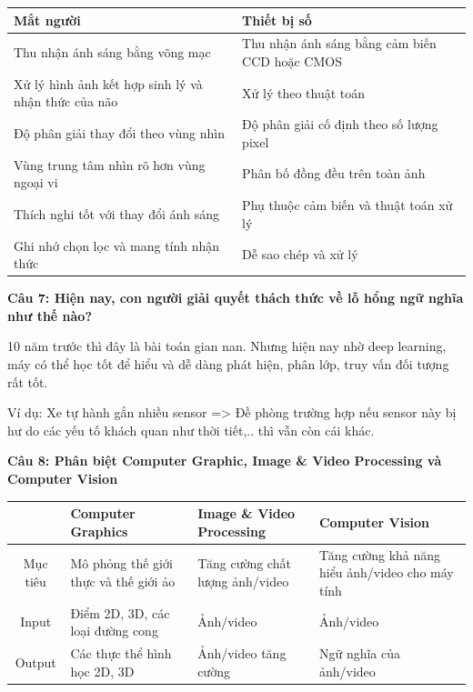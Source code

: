 \begin{table}[H]
	\centering
	\begin{tabular}{|p{7cm}|p{7cm}|}
		\hline
		Mắt người & Thiết bị số \\ \hline
		Thu nhận ánh sáng bằng võng mạc & Thu nhận ánh sáng bằng cảm biến CCD hoặc CMOS \\ \hline
		Xử lý hình ảnh kết hợp sinh lý và nhận thức của não & Xử lý theo thuật toán \\ \hline
		Độ phân giải thay đổi theo vùng nhìn & Độ phân giải cố định theo số lượng pixel \\ \hline
		Vùng trung tâm nhìn rõ hơn vùng ngoại vi & Phân bố đồng đều trên toàn ảnh \\ \hline
		Thích nghi tốt với thay đổi ánh sáng & Phụ thuộc cảm biến và thuật toán xử lý \\ \hline
		Ghi nhớ chọn lọc và mang tính nhận thức & Dễ sao chép và xử lý \\ \hline
	\end{tabular}
\end{table}

\textbf{Câu 7: Hiện nay, con người giải quyết thách thức về lỗ hổng ngữ nghĩa như thế nào?}

10 năm trước thì đây là bài toán gian nan. Nhưng hiện nay nhờ deep learning, máy có thể học tốt để hiểu và dễ dàng phát hiện, phân lớp, truy vấn đối tượng rất tốt.

Ví dụ: Xe tự hành gắn nhiều sensor => Đề phòng trường hợp nếu sensor này bị hư do các yếu tố khách quan như thời tiết,.. thì vẫn còn cái khác.

\textbf{Câu 8: Phân biệt Computer Graphic, Image \& Video Processing và Computer Vision}

\begin{table}[H]
	\centering
	\begin{tabular}{|c|p{4cm}|p{4cm}|p{4cm}|}
		\hline
		& Computer Graphics & Image \& Video Processing & Computer Vision \\ \hline
		Mục tiêu & Mô phỏng thế giới thực và thế giới ảo & Tăng cường chất lượng ảnh/video & Tăng cường khả năng hiểu ảnh/video cho máy tính \\ \hline
		Input & Điểm 2D, 3D, các loại đường cong & Ảnh/video & Ảnh/video \\ \hline
		Output & Các thực thể hình học 2D, 3D & Ảnh/video tăng cường & Ngữ nghĩa của ảnh/video \\ \hline
	\end{tabular}
\end{table}

